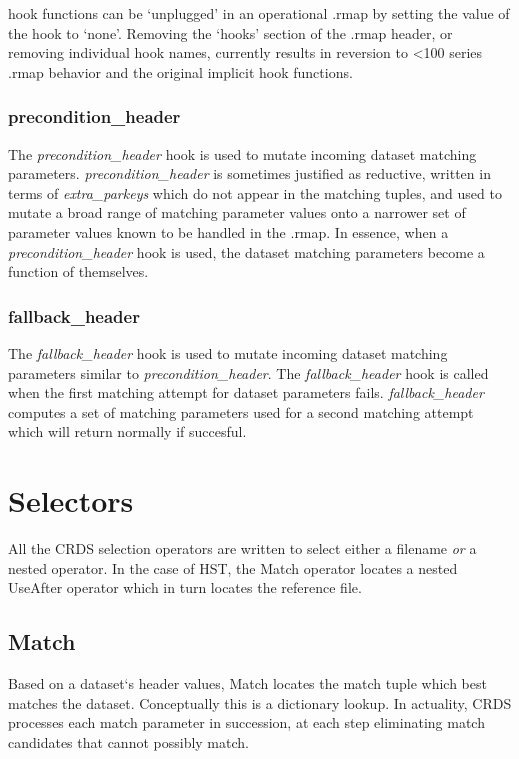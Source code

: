 \documentclass[letterpaper,10pt,english]{sphinxmanual}
\begin{document}
hook functions can be `unplugged' in an operational .rmap by setting the value of the hook to `none'.  Removing the
`hooks' section of the .rmap header, or removing individual hook names, currently results in reversion to \textless{}100 series
.rmap behavior and the original implicit hook functions.


\subsubsection{precondition\_header}
\label{rmap_syntax:precondition-header}
The \emph{precondition\_header} hook is used to mutate incoming dataset matching parameters.   \emph{precondition\_header} is
sometimes justified as reductive,  written in terms of \emph{extra\_parkeys} which do not appear in the matching tuples,
and used to mutate a broad range of matching parameter values onto a narrower set of parameter values known to be
handled in the .rmap.   In essence,  when a \emph{precondition\_header} hook is used,  the dataset matching parameters
become a function of themselves.


\subsubsection{fallback\_header}
\label{rmap_syntax:fallback-header}
The \emph{fallback\_header} hook is used to mutate incoming dataset matching parameters similar to \emph{precondition\_header}.
The \emph{fallback\_header} hook is called when the first matching attempt for dataset parameters fails.  \emph{fallback\_header}
computes a set of matching parameters used for a second matching attempt which will return normally if succesful.


\section{Selectors}
\label{rmap_syntax:selectors}
All the CRDS selection operators are written to select either a filename \emph{or} a nested operator.   In the case of HST,
the Match operator locates a nested UseAfter operator which in turn locates the reference file.


\subsection{Match}
\label{rmap_syntax:match}
Based on a dataset{}`s header values,  Match locates the match tuple which best matches the dataset.   Conceptually this
is a dictionary lookup.   In actuality, CRDS processes each match parameter in succession,  at each step eliminating
match candidates that cannot possibly match.
\end{document}
